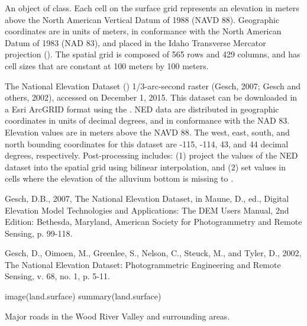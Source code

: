 \documentclass[a4paper]{book}
\begin{document}
%
\begin{Format}
An object of  class.
Each cell on the surface grid represents an elevation in meters above the North American Vertical Datum of 1988 (NAVD 88).
Geographic coordinates are in units of meters, in conformance with the North American Datum of 1983 (NAD 83), and placed in the
Idaho Transverse Mercator projection ().
The spatial grid is composed of 565 rows and 429 columns, and has cell sizes that are constant at 100 meters by 100 meters.
\end{Format}
%
\begin{Source}\relax
The National Elevation Dataset () 1/3-arc-second raster (Gesch, 2007; Gesch and others, 2002), accessed on December 1, 2015.
This dataset can be downloaded in a Esri ArcGRID format using the .
NED data are distributed in geographic coordinates in units of decimal degrees, and in conformance with the NAD 83.
Elevation values are in meters above the NAVD 88.
The west, east, south, and north bounding coordinates for this dataset are -115, -114, 43, and 44 decimal degrees, respectively.
Post-processing includes:
(1) project the values of the NED dataset into the  spatial grid using bilinear interpolation, and
(2) set values in cells where the elevation of the alluvium bottom is missing to .
\end{Source}
%
\begin{References}\relax
Gesch, D.B., 2007, The National Elevation Dataset, in Maune, D., ed., Digital Elevation Model Technologies and Applications: The DEM Users Manual, 2nd Edition: Bethesda, Maryland, American Society for Photogrammetry and Remote Sensing, p. 99-118.

Gesch, D., Oimoen, M., Greenlee, S., Nelson, C., Steuck, M., and Tyler, D., 2002, The National Elevation Dataset: Photogrammetric Engineering and Remote Sensing, v. 68, no. 1, p. 5-11.
\end{References}
%
\begin{Examples}
\begin{ExampleCode}
image(land.surface)
summary(land.surface)
\end{ExampleCode}
\end{Examples}
%
\begin{Description}\relax
Major roads in the Wood River Valley and surrounding areas.
\end{Description}
\end{document}
